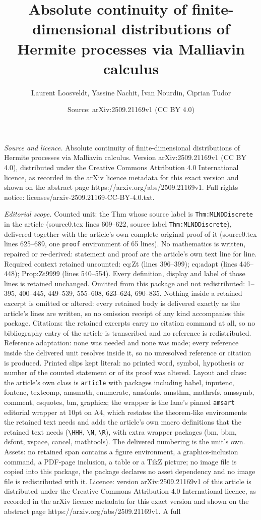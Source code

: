 \documentclass[10pt,a4paper]{amsart}
\title[Absolute continuity of finite-dimensional distributions of H]{Absolute continuity of finite-dimensional distributions of Hermite processes via Malliavin calculus}
\author{Laurent Loosveldt, Yassine Nachit, Ivan Nourdin, Ciprian Tudor}
\date{Source: arXiv:2509.21169v1 (CC BY 4.0)}
\begin{document}
\maketitle

\noindent\emph{Source and licence.} Absolute continuity of finite-dimensional distributions of Hermite processes via Malliavin calculus. Version arXiv:2509.21169v1 (CC BY 4.0), distributed under the Creative Commons Attribution 4.0 International licence, as recorded in the arXiv licence metadata for this exact version and shown on the abstract page https://arxiv.org/abs/2509.21169v1. Full rights notice: licenses/arxiv-2509.21169-CC-BY-4.0.txt.\par\smallskip

\noindent\textit{Editorial scope.} Counted unit: the Thm whose source label is \texttt{Thm:MLNDDiscrete} in the article (source0.tex lines 609--622, source label \texttt{Thm:MLNDDiscrete}), delivered together with the article's own complete original proof of it (source0.tex lines 625--689, one \texttt{proof} environment of 65 lines). No mathematics is written, repaired or re-derived: statement and proof are the article's own text line for line. Required context retained uncounted: eq:Zt (lines 396--399); eq:adapt (lines 446--448); Prop:Zt9999 (lines 540--554). Every definition, display and label of those lines is retained unchanged. Omitted from this package and not redistributed: 1--395, 400--445, 449--539, 555--608, 623--624, 690--835. Nothing inside a retained excerpt is omitted or altered: every retained body is delivered exactly as the article's lines are written, so no omission receipt of any kind accompanies this package. Citations: the retained excerpts carry no citation command at all, so no bibliography entry of the article is transcribed and no reference is redistributed. Reference adaptation: none was needed and none was made; every reference inside the delivered unit resolves inside it, so no unresolved reference or citation is produced. Printed slips kept literal: no printed word, symbol, hypothesis or number of the counted statement or of its proof was altered. Layout and class: the article's own class is \texttt{article} with packages including babel, inputenc, fontenc, textcomp, amsmath, enumerate, amsfonts, amsthm, mathrsfs, amssymb, comment, csquotes, bm, graphicx; the wrapper is the lane's pinned \texttt{amsart} editorial wrapper at 10pt on A4, which restates the theorem-like environments the retained text needs and adds the article's own macro definitions that the retained text needs (\texttt{\textbackslash HHH}, \texttt{\textbackslash N}, \texttt{\textbackslash R}), with extra wrapper packages (bm, bbm, dsfont, xspace, cancel, mathtools). The delivered numbering is the unit's own. Assets: no retained span contains a figure environment, a graphics-inclusion command, a PDF-page inclusion, a table or a TikZ picture; no image file is copied into this package, the package declares no asset dependency and no image file is redistributed with it. Licence: version arXiv:2509.21169v1 of this article is distributed under the Creative Commons Attribution 4.0 International licence, as recorded in the arXiv licence metadata for this exact version and shown on the abstract page https://arxiv.org/abs/2509.21169v1. A full 
\end{document}
